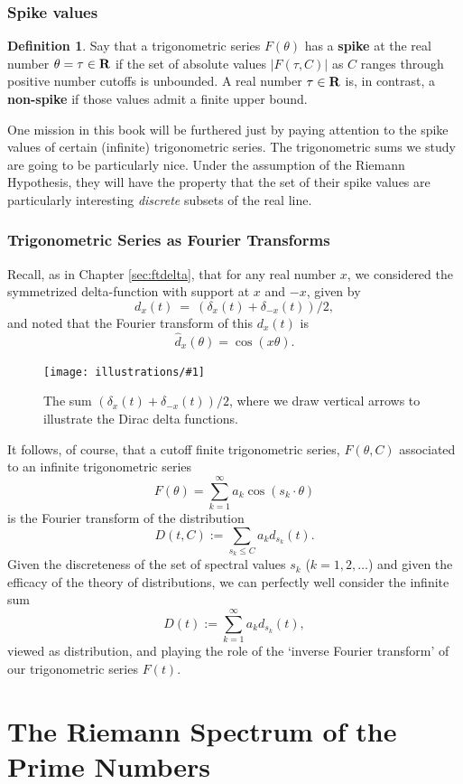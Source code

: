 \documentclass[openany]{book}
\newcommand{\ill}[3]{%
   \begin{figure}[H]%
   \vspace{-2ex}
   \centering%
   \texttt{[image: illustrations/\#1]}%
   \caption{#3}%
   \vspace{-2ex}
    \end{figure}}
\theoremstyle{plain}
\theoremstyle{definition}
\newtheorem{definition}[theorem]{Definition}
\begin{document}
{{\section{\bf Spike values} \begin{definition} Say
  that a trigonometric series $F(\theta)$ has a {\bf spike} at the real number $\theta=\tau \in {\bf R}$
if the set of absolute values $|F(\tau,C)|$  as $C$ ranges through positive number cutoffs is
  unbounded.  A real number $\tau \in {\bf R}$ is, in contrast, a {\bf
    non-spike} if those values admit a finite upper
  bound. \end{definition}

   One mission in this book will be furthered just by paying attention to the  spike values of certain (infinite) trigonometric series.
    The trigonometric sums we study are
  going to be particularly nice. Under the assumption of the Riemann
  Hypothesis, they  will have the
  property that the set of their spike values are particularly interesting {\it discrete}
  subsets of the real line.

\section{Trigonometric Series as Fourier Transforms}


Recall, as in Chapter \ref{sec:ftdelta}, that for any real number $x$, we considered
the symmetrized delta-function with support at $x$ and $-x$, given
by
$$
 d_x(t) \ = \ (\delta_x(t) + \delta_{-x}(t))/2,
$$
and noted that the Fourier transform of this $d_x(t)$  is
$$
   \label{dx2}{\hat d_x}(\theta)  = \cos(x\theta).
$$
\ill{two_delta}{0.4}{The sum $(\delta_x(t) + \delta_{-x}(t))/2$,
where we draw vertical arrows to illustrate the Dirac delta functions.}

It follows, of course, that a cutoff finite trigonometric series,
$F(\theta,C)$ associated to an infinite trigonometric series
$$
 F(\theta) = \sum_{k=1}^{\infty} a_k\cos(s_k\cdot \theta)
$$
is the Fourier transform of the distribution
$$
 D(t,C):=\sum_{s_k \le C}a_kd_{s_k}(t).
$$
Given the discreteness of the set of spectral values $s_k$ ($k=1,2,\dots$)  and
given the efficacy of  the theory of distributions, we can perfectly well
consider the infinite sum
$$
 D(t):=\sum_{k=1}^{\infty}a_kd_{s_k}(t),
$$ viewed as distribution, and playing the role of
the `inverse Fourier transform' of our trigonometric
series $F(t)$.


\part{The Riemann Spectrum of the Prime Numbers\label{part3}}

}}
\end{document}
